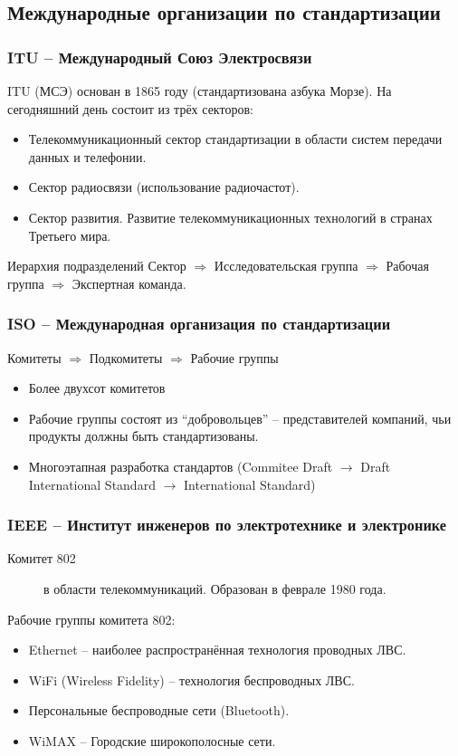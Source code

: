 \documentclass[utf8]{beamer}
\begin{document}
\subsection{Международные организации по стандартизации}
\begin{frame}
\frametitle{ITU -- Международный Союз Электросвязи}
ITU (МСЭ) основан в 1865 году (стандартизована азбука Морзе). На сегодняшний день состоит из трёх секторов:
 \begin{itemize}
  \item [ITU-T] Телекоммуникационный сектор стандартизации в области систем передачи данных и телефонии.
  \item [ITU-R] Сектор радиосвязи (использование радиочастот).
  \item [ITU-D] Сектор развития. Развитие телекоммуникационных технологий в странах Третьего мира.
\end{itemize}
\begin{block}{Иерархия подразделений}
Сектор $\Rightarrow$ Исследовательская группа $\Rightarrow$ Рабочая группа $\Rightarrow$ Экспертная команда.
\end{block}
\end{frame}
\begin{frame}
\frametitle{ISO -- Международная организация по стандартизации}
Комитеты $\Rightarrow$ Подкомитеты $\Rightarrow$ Рабочие группы
\begin{itemize}
 \item Более двухсот комитетов
 \item Рабочие группы состоят из ``добровольцев'' -- представителей компаний, чьи продукты должны быть стандартизованы.
 \item Многоэтапная разработка стандартов (Commitee Draft $\rightarrow$ Draft International Standard $\rightarrow$ International Standard)
\end{itemize}
\end{frame}
\begin{frame}
\frametitle {IEEE -- Институт инженеров по электротехнике и электронике}
\begin{description}
 \item [Комитет 802] в области телекоммуникаций. Образован в феврале 1980 года.
\end{description}
\begin{block}{Рабочие группы комитета 802:}
\begin{itemize}
 \item [802.3] Ethernet -- наиболее распространённая технология проводных ЛВС.
 \item [802.11] WiFi (Wireless Fidelity) -- технология беспроводных ЛВС.
 \item [802.15] Персональные беспроводные сети (Bluetooth).
 \item [802.16] WiMAX -- Городские широкополосные сети.
\end{itemize}
\end{block}
\end{frame}
\end{document}
